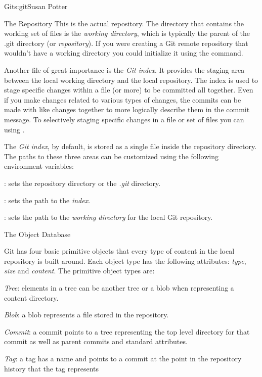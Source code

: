 \begin{aosachapter}{Git}{s:git}{Susan Potter}
\begin{aosasect1}{The Repository}
This is the actual repository. The directory that contains the working set
of files is the \emph{working directory}, which is typically the parent of
the .git directory (or \emph{repository}). If you were creating a Git
remote repository that wouldn't have a working directory you could
initialize it using the  command.

Another file of great importance is the \emph{Git index}. It provides the
staging area between the local working directory and the local repository.
The index is used to stage specific changes within a file (or more) to
be committed all together. Even if you make changes related to various types
of changes, the commits can be made with like changes together to more
logically describe them in the commit message. To selectively staging
specific changes in a file or set of files you can using .

The \emph{Git index}, by default, is stored as a single file inside the
repository directory. The paths to these three areas can be customized
using the following environment variables:
\begin{aosaitemize}
  \item {}: sets the repository directory or the \emph{.git}
  directory.
  \item {}: sets the path to the \emph{index}.
  \item {}: sets the path to the \emph{working directory}
  for the local Git repository.
\end{aosaitemize}

\end{aosasect1}

\begin{aosasect1}{The Object Database}


Git has four basic primitive objects that every type of content in the
local repository is built around. Each object type has the following
attributes: \emph{type}, \emph{size} and \emph{content}. The primitive object
types are:
\begin{aosaitemize}
  \item \emph{Tree}: elements in a tree can be another tree or a blob when
  representing a content directory.
  \item \emph{Blob}: a blob represents a file stored in the repository.
  \item \emph{Commit}: a commit points to a tree representing the top level
  directory for that commit as well as parent commits and standard
  attributes.
  \item \emph{Tag}: a tag has a name and points to a commit at the point in
  the repository history that the tag represents
\end{aosaitemize}


\end{aosasect1}
\end{aosachapter}
